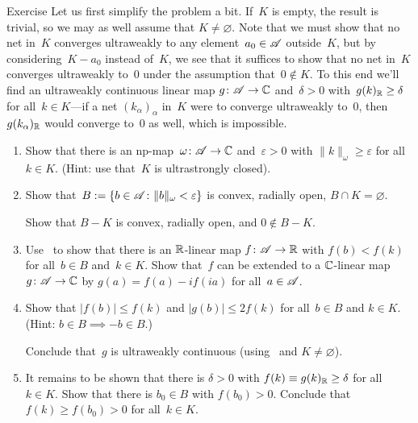 \documentclass[a]{subfiles}
\begin{document}
\begin{parsec}
\begin{point}[ultraclosed]{Exercise}
Let us first simplify the problem a bit.
If~$K$ is empty, the result is trivial,
so we may as well assume that $K\neq \varnothing$.
Note that we must show that no net in~$K$ converges ultraweakly
to any element~$a_0\in\mathscr{A}$ outside~$K$,
but by considering~$K-a_0$ instead of~$K$,
we see that it suffices to show that
no net in~$K$ converges ultraweakly to~$0$
under the assumption that~$0\notin K$.
To this end we'll find an ultraweakly continuous linear map
$g\colon \mathscr{A}\to \mathbb{C}$ and~$\delta>0$ 
with~$g(k)_{\mathbb{R}}\geq \delta$ for all~$k\in K$---if
a net $(k_\alpha)_\alpha$ in~$K$ were to converge ultraweakly to~$0$,
then~$g(k_\alpha)_{\mathbb{R}}$ would converge to~$0$ as well,
which is impossible.
\begin{enumerate}
\item
	Show that 
	there is an np-map~$\omega \colon\mathscr{A}\to\mathbb{C}$
	and~$\varepsilon>0$ 
	with $\|k\|_\omega \geq \varepsilon$ for all~$k\in K$.
	(Hint: use that~$K$ is ultrastrongly closed).
\item
	Show that~$B:= \{ b\in \mathscr{A}\colon \|b\|_\omega < \varepsilon\}$
	 is convex, radially open, $B\cap K=\varnothing$.

	Show that $B-K$ is convex, radially open, and $0\notin B-K$.
\item
	Use~ to show that
	 there is an $\mathbb{R}$-linear map $f\colon \mathscr{A}\to \mathbb{R}$
	with $f(b)<f(k)$ for all~$b\in B$ and~$k\in K$.
	Show that~$f$
	can be extended to a $\mathbb{C}$-linear map
	$g \colon \mathscr{A}\to \mathbb{C}$
	by $g(a)= f(a)-if(ia)$ for all~$a\in\mathscr{A}$.
\item
	Show that $\left| f(b)\right| \leq f(k)$ 
	and $\left|g(b)\right|\leq 2f(k)$
	for all~$b\in B$ and $k\in K$.\\
	(Hint: $b\in B\implies -b\in B$.)

	Conclude that~$g$ is ultraweakly continuous
	(using~ and $K\neq \varnothing$).
\item
	It remains to be shown that
	there is $\delta>0$ with $f(k)\equiv g(k)_{\mathbb{R}}\geq \delta$
	for all~$k\in K$.
	Show that there is $b_0\in B$
	with $f(b_0) >0$.
	Conclude that $f(k)\geq f(b_0)>0 $ for all~$k\in K$.
\end{enumerate}
\end{point}

\end{parsec}
\end{document}

